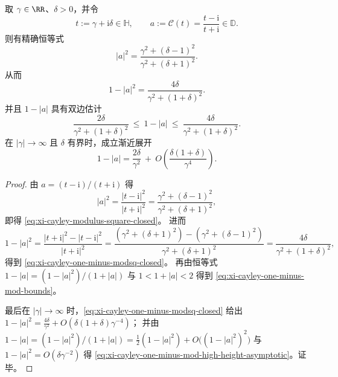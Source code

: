 \begin{proposition}[盘内极点的模长闭式与边界层深度的高高度渐近]\label{prop:xi-toeplitz-diskpole-modulus-closed-form-high-height}
取 \(\gamma\in\RR\)、\(\delta>0\)，并令
\[
t:=\gamma+\mathrm{i}\delta\in\mathbb{H},
\qquad
a:=\mathcal{C}(t)=\frac{t-\mathrm{i}}{t+\mathrm{i}}\in\mathbb{D}.
\]
则有精确恒等式
\begin{equation}\label{eq:xi-cayley-modulus-square-closed}
|a|^2=\frac{\gamma^2+(\delta-1)^2}{\gamma^2+(\delta+1)^2}.
\end{equation}
从而
\begin{equation}\label{eq:xi-cayley-one-minus-modsq-closed}
1-|a|^2=\frac{4\delta}{\gamma^2+(1+\delta)^2}.
\end{equation}
并且 \(1-|a|\) 具有双边估计
\begin{equation}\label{eq:xi-cayley-one-minus-mod-bounds}
\frac{2\delta}{\gamma^2+(1+\delta)^2}
\ \le\
1-|a|
\ \le\
\frac{4\delta}{\gamma^2+(1+\delta)^2}.
\end{equation}
在 \(|\gamma|\to\infty\) 且 \(\delta\) 有界时，成立渐近展开
\begin{equation}\label{eq:xi-cayley-one-minus-mod-high-height-asymptotic}
1-|a|
=\frac{2\delta}{\gamma^2}
\ +\ O\!\left(\frac{\delta(1+\delta)}{\gamma^4}\right).
\end{equation}
\end{proposition}
\begin{proof}
由 \(a=(t-\mathrm{i})/(t+\mathrm{i})\) 得
\[
|a|^2=\frac{|t-\mathrm{i}|^2}{|t+\mathrm{i}|^2}
=\frac{\gamma^2+(\delta-1)^2}{\gamma^2+(\delta+1)^2},
\]
即得 \eqref{eq:xi-cayley-modulus-square-closed}。
进而
\[
1-|a|^2
=\frac{|t+\mathrm{i}|^2-|t-\mathrm{i}|^2}{|t+\mathrm{i}|^2}
=\frac{(\gamma^2+(\delta+1)^2)-(\gamma^2+(\delta-1)^2)}{\gamma^2+(\delta+1)^2}
=\frac{4\delta}{\gamma^2+(1+\delta)^2},
\]
得到 \eqref{eq:xi-cayley-one-minus-modsq-closed}。
再由恒等式
\(
1-|a|=(1-|a|^2)/(1+|a|)
\)
与 \(1<1+|a|<2\) 得到 \eqref{eq:xi-cayley-one-minus-mod-bounds}。
\par
最后在 \(|\gamma|\to\infty\) 时，\eqref{eq:xi-cayley-one-minus-modsq-closed} 给出
\(
1-|a|^2=\frac{4\delta}{\gamma^2}+O(\delta(1+\delta)\gamma^{-4})
\)；
并由
\(
1-|a|=(1-|a|^2)/(1+|a|)=\tfrac12(1-|a|^2)+O\bigl((1-|a|^2)^2\bigr)
\)
与 \(1-|a|^2=O(\delta\gamma^{-2})\) 得 \eqref{eq:xi-cayley-one-minus-mod-high-height-asymptotic}。证毕。
\end{proof}

